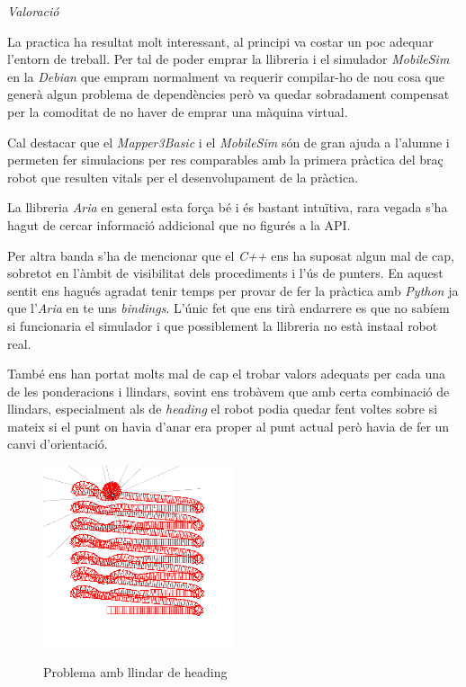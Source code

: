 \emph{Valoració}

La practica ha resultat molt interessant, al principi va costar un poc adequar l'entorn de treball.
Per tal de poder emprar la llibreria i el simulador \emph{MobileSim} en la \emph{Debian} que empram normalment
va requerir compilar-ho de nou cosa que generà algun problema de dependències però va quedar sobradament
compensat per la comoditat de no haver de emprar una màquina virtual.

Cal destacar que el \emph{Mapper3Basic} i el \emph{MobileSim} són de gran ajuda a l'alumne i permeten fer simulacions
per res comparables amb la primera pràctica del braç robot que resulten vitals per el desenvolupament de la pràctica.

La llibreria \emph{Aria} en general esta força bé i és bastant intuïtiva, rara vegada s'ha hagut de cercar
informació addicional que no figurés a la API.

Per altra banda s'ha de mencionar que el \emph{C++} ens ha suposat algun mal de cap, sobretot en l'àmbit
de visibilitat dels procediments i l'ús de punters. En aquest sentit ens hagués agradat tenir temps
per provar de fer la pràctica amb \emph{Python} ja que l'\emph{Aria} en te uns \emph{bindings}. 
L'únic fet que ens tirà endarrere es que no sabíem si funcionaria
el simulador i que possiblement la llibreria no està insta\lgem al robot real.

També ens han portat molts mal de cap el trobar valors adequats per cada una de les ponderacions i llindars,
sovint ens trobàvem que amb certa combinació de llindars, especialment als de \emph{heading} el robot podia quedar
fent voltes sobre si mateix si el punt on havia d'anar era proper al punt actual però havia de fer un canvi
d'orientació. 

\begin{figure}[H]
\begin{center}\label{headingthproblem}
 \includegraphics[width=0.5\textwidth]{diagrames/figures/voltes.png}
\end{center}
  \caption{Problema amb llindar de heading}
\end{figure}

